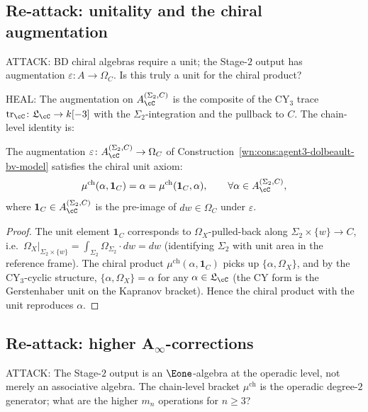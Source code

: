 \subsection{Re-attack: unitality and the chiral augmentation}
\label{wn:subsec:agent3-unitality-reattack}

ATTACK: BD chiral algebras require a unit; the Stage-$2$ output has augmentation $\varepsilon\colon A\to\Omega_C$. Is this truly a unit for the chiral product?

HEAL: The augmentation on $A^{(\Sigma_2,C)}_\cC$ is the composite of the CY$_3$ trace $\mathrm{tr}_\cC\colon\mathfrak{L}_\cC\to k[-3]$ with the $\Sigma_2$-integration and the pullback to $C$. The chain-level identity is:

\begin{proposition}
\label{wn:prop:agent3-chiral-unit}
\ClaimStatusProvedHere
The augmentation $\varepsilon\colon A^{(\Sigma_2,C)}_\cC\to\Omega_C$ of Construction~\ref{wn:cons:agent3-dolbeault-bv-model} satisfies the chiral unit axiom:
\[
 \mu^{\mathrm{ch}}(\alpha,\mathbf 1_C)=\alpha=\mu^{\mathrm{ch}}(\mathbf 1_C,\alpha),\qquad\forall\alpha\in A^{(\Sigma_2,C)}_\cC,
\]
where $\mathbf 1_C\in A^{(\Sigma_2,C)}_\cC$ is the pre-image of $dw\in\Omega_C$ under $\varepsilon$.
\end{proposition}

\begin{proof}
The unit element $\mathbf 1_C$ corresponds to $\Omega_X$-pulled-back along $\Sigma_2\times\{w\}\to C$, i.e.\ $\Omega_X|_{\Sigma_2\times\{w\}}=\int_{\Sigma_2}\Omega_{\Sigma_2}\cdot dw=dw$ (identifying $\Sigma_2$ with unit area in the reference frame). The chiral product $\mu^{\mathrm{ch}}(\alpha,\mathbf 1_C)$ picks up $\{\alpha,\Omega_X\}$, and by the CY$_3$-cyclic structure, $\{\alpha,\Omega_X\}=\alpha$ for any $\alpha\in\mathfrak{L}_\cC$ (the CY form is the Gerstenhaber unit on the Kapranov bracket). Hence the chiral product with the unit reproduces $\alpha$.
\end{proof}

\subsection{Re-attack: higher A\texorpdfstring{$_\infty$}{-infty}-corrections}
\label{wn:subsec:agent3-higher-Ainf-reattack}

ATTACK: The Stage-$2$ output is an $\Eone$-algebra at the operadic level, not merely an associative algebra. The chain-level bracket $\mu^{\mathrm{ch}}$ is the operadic degree-$2$ generator; what are the higher $m_n$ operations for $n\geq 3$?

